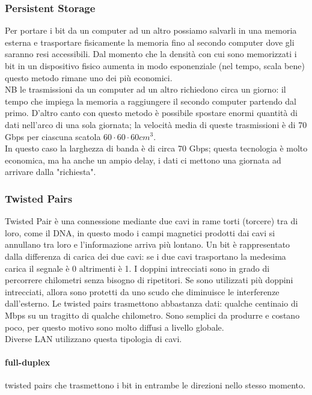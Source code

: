 \documentclass{article}
\begin{document}
\subsubsection{Persistent Storage}
Per portare i bit da un computer ad un altro possiamo salvarli in una memoria
esterna e trasportare fisicamente la memoria fino al secondo computer dove gli
saranno resi accessibili.
Dal momento che la densità con cui sono memorizzati i bit in un dispositivo
fisico aumenta in modo esponenziale (nel tempo, scala bene) questo metodo rimane uno dei
più economici.\\
NB le trasmissioni da un computer ad un altro richiedono circa un
giorno: il tempo che impiega la memoria a raggiungere il secondo computer
partendo dal primo. D'altro canto con questo metodo è possibile spostare enormi
quantità di dati nell'arco di una sola giornata; la velocità media di queste
trasmissioni è di 70 Gbps per ciascuna scatola $60 \cdot 60 \cdot 60 cm^3$.\\
In questo caso la larghezza di banda è di circa 70 Gbps; questa tecnologia è
molto economica, ma ha anche un ampio delay, i dati ci mettono una giornata ad
arrivare dalla "richiesta".

\subsubsection{Twisted Pairs}
Twisted Pair è una connessione mediante due cavi in rame torti (torcere) tra di
loro, come il DNA, in questo modo i campi magnetici prodotti dai cavi si
annullano tra loro e l'informazione arriva più lontano. Un bit è rappresentato
dalla differenza di carica dei due cavi: se i due cavi trasportano la medesima
carica il segnale è 0 altrimenti è 1. I doppini intrecciati sono in grado di
percorrere chilometri senza bisogno di ripetitori. Se sono utilizzati
più doppini intrecciati, allora sono protetti da uno scudo che diminuisce le
interferenze dall'esterno. Le twisted pairs trasmettono abbastanza dati:
qualche centinaio di Mbps su un tragitto di qualche chilometro. Sono semplici
da produrre e costano poco, per questo motivo sono molto diffusi a livello
globale.\\
Diverse LAN utilizzano questa tipologia di cavi.

\paragraph{full-duplex} twisted pairs che trasmettono i bit in
entrambe le direzioni nello stesso momento.
\end{document}
